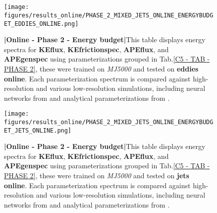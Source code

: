 %
%
\newpage
\thispagestyle{empty}
\part{}
\newpage

%
%
\begin{figure}[H]
    \centering
    \texttt{[image: figures/results\_online/PHASE\_2\_MIXED\_JETS\_ONLINE\_ENERGYBUDGET\_EDDIES\_ONLINE.png]}
    \caption{\textbf{|}\textcolor{section_color}{\textbf{Online - Phase 2 - Energy budget}}\textbf{|}This table displays energy spectra for \textbf{KEflux}, \textbf{KEfrictionspec}, \textbf{APEflux}, and \textbf{APEgenspec} using parameterizations grouped in Tab.\ref{C5 - TAB - PHASE 2}, these were trained on \textit{MJ5000} and tested on \textbf{eddies online}. Each parameterization spectrum is compared against high-resolution and various low-resolution simulations, including neural networks from \cite{Benchmarking} and analytical parameterizations from \cite{ClosureAnalytical2, ClosureAnalytical51, ClosureDataDrivenZanna}.
}
    \label{APP - ONLINE - PHASE 2 - ENERGY BUDGET -  JETS MIXED 5000 and EDDIES ONLINE}
\end{figure}

\newpage


\begin{figure}[H]
    \centering
    \texttt{[image: figures/results\_online/PHASE\_2\_MIXED\_JETS\_ONLINE\_ENERGYBUDGET\_JETS\_ONLINE.png]}
    \caption{\textbf{|}\textcolor{section_color}{\textbf{Online - Phase 2 - Energy budget}}\textbf{|}This table displays energy spectra for \textbf{KEflux}, \textbf{KEfrictionspec}, \textbf{APEflux}, and \textbf{APEgenspec} using parameterizations grouped in Tab.\ref{C5 - TAB - PHASE 2}, these were trained on \textit{MJ5000} and tested on \textbf{jets online}. Each parameterization spectrum is compared against high-resolution and various low-resolution simulations, including neural networks from \cite{Benchmarking} and analytical parameterizations from \cite{ClosureAnalytical2, ClosureAnalytical51, ClosureDataDrivenZanna}.
}
    \label{APP - ONLINE - PHASE 2 - ENERGY BUDGET -  JETS MIXED 5000 and JETS ONLINE}
\end{figure}

